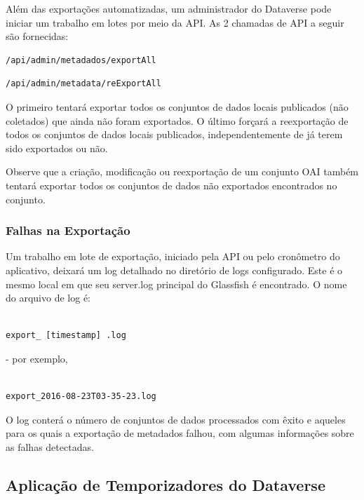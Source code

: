 \documentclass[12pt,hidelinks]{article}
\begin{document}
\qquad Além das exportações automatizadas, um administrador do Dataverse pode iniciar um trabalho em lotes por meio da API. As 2 chamadas de API a seguir são fornecidas:

\begin{verbatim}
/api/admin/metadados/exportAll
\end{verbatim}

\begin{verbatim}
/api/admin/metadata/reExportAll
\end{verbatim}

O primeiro tentará exportar todos os conjuntos de dados locais publicados (não coletados) que ainda não foram exportados. O último forçará a reexportação de todos os conjuntos de dados locais publicados, independentemente de já terem sido exportados ou não.

Observe que a criação, modificação ou reexportação de um conjunto OAI também tentará exportar todos os conjuntos de dados não exportados encontrados no conjunto.

\subsubsection{Falhas na Exportação}

\qquad Um trabalho em lote de exportação, iniciado pela API ou pelo cronômetro do aplicativo, deixará um log detalhado no diretório de logs configurado. Este é o mesmo local em que seu server.log principal do Glassfish é encontrado. O nome do arquivo de log é:

\begin{verbatim}

export_ [timestamp] .log

\end{verbatim}

- por exemplo,

\begin{verbatim}

export_2016-08-23T03-35-23.log

\end{verbatim}
  
O log conterá o número de conjuntos de dados processados com êxito e aqueles para os quais a exportação de metadados falhou, com algumas informações sobre as falhas detectadas.


\subsection{Aplicação de Temporizadores do Dataverse}
\end{document}
